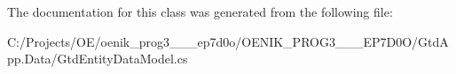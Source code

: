 The documentation for this class was generated from the following file\+:\begin{DoxyCompactItemize}
\item 
C\+:/\+Projects/\+O\+E/oenik\+\_\+prog3\+\_\+\_\+\_\+ep7d0o/\+O\+E\+N\+I\+K\+\_\+\+P\+R\+O\+G3\+\_\+\_\+\_\+\+E\+P7\+D0\+O/\+Gtd\+App.\+Data/Gtd\+Entity\+Data\+Model.\+cs\end{DoxyCompactItemize}
